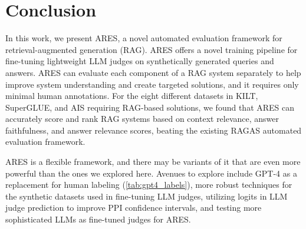 



\section{Conclusion}

In this work, we present ARES, a novel automated evaluation framework for retrieval-augmented generation (RAG).
ARES offers a novel training pipeline for fine-tuning lightweight LLM judges on synthetically generated queries and answers.
ARES can evaluate each component of a RAG system separately to help improve system understanding and create targeted solutions, and it requires only minimal human annotations.
For the eight different datasets in KILT, SuperGLUE, and AIS requiring RAG-based solutions, we found that ARES can accurately score and rank RAG systems based on context relevance, answer faithfulness, and answer relevance scores, beating the existing RAGAS automated evaluation framework. 

ARES is a flexible framework, and there may be variants of it that are even more powerful than the ones we explored here. Avenues to explore include GPT-4 as a replacement for human labeling (\autoref{tab:gpt4_labels}), more robust techniques for the synthetic datasets used in fine-tuning LLM judges, 
utilizing logits in LLM judge prediction to improve PPI confidence intervals, and testing more sophisticated LLMs as fine-tuned judges for ARES.
    
